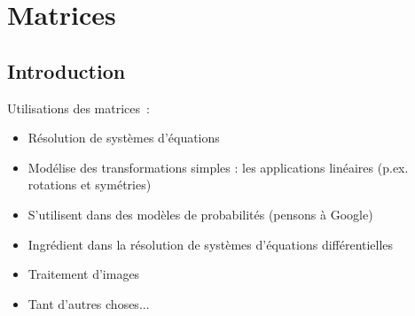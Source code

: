\section{Matrices}

\subsection{Introduction}
\begin{frame}
  Utilisations des matrices~:\pause{}
  \begin{itemize}
  \item Résolution de systèmes d'équations\pause{}
  \item Modélise des transformations simples : les \og applications linéaires\fg{}\pause{} (p.ex. rotations et symétries)\pause{}
  \item S'utilisent dans des modèles de probabilités (pensons à Google)\pause{}
  \item Ingrédient dans la résolution de systèmes d'équations différentielles\pause{}
  \item Traitement d'images\pause
  \item Tant d'autres choses...
  \end{itemize}
\end{frame}
